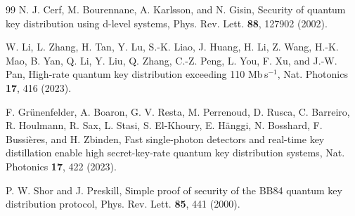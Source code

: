 \documentclass[11pt]{article}
\begin{document}
\begin{thebibliography}{99}
 N. J. Cerf, M. Bourennane, A. Karlsson, and N. Gisin, Security of quantum key distribution using d-level systems, Phys. Rev. Lett. \textbf{88}, 127902 (2002).

 W. Li, L. Zhang, H. Tan, Y. Lu, S.-K. Liao, J. Huang, H. Li, Z. Wang, H.-K. Mao, B. Yan, Q. Li, Y. Liu, Q. Zhang, C.-Z. Peng, L. You, F. Xu, and J.-W. Pan, High-rate quantum key distribution exceeding 110 Mb\,s$^{-1}$, Nat. Photonics \textbf{17}, 416 (2023).

 F. Gr\"unenfelder, A. Boaron, G. V. Resta, M. Perrenoud, D. Rusca, C. Barreiro, R. Houlmann, R. Sax, L. Stasi, S. El-Khoury, E. H\"anggi, N. Bosshard, F. Bussi\`eres, and H. Zbinden, Fast single-photon detectors and real-time key distillation enable high secret-key-rate quantum key distribution systems, Nat. Photonics \textbf{17}, 422 (2023).

 P. W. Shor and J. Preskill, Simple proof of security of the BB84 quantum key distribution protocol, Phys. Rev. Lett. \textbf{85}, 441 (2000).

\end{thebibliography}
\end{document}
